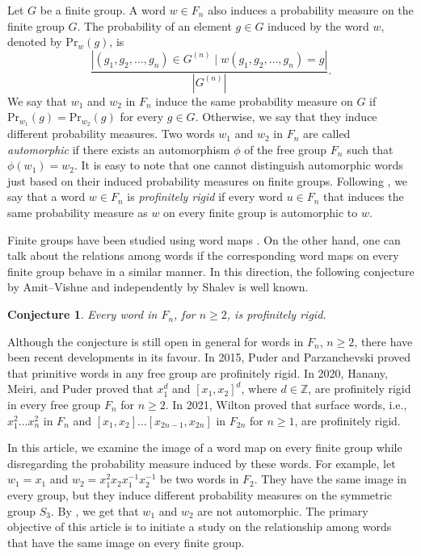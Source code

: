 \documentclass[12pt]{amsart}
\def \Z {{\mathbb{Z}}}
\newtheorem{conj}[theorem]{Conjecture}
\begin{document}
Let $G$ be a finite group. A word $w \in F_n$ also induces a probability measure on the finite group $G.$ The probability of an element $g \in G$ induced by the word $w$, denoted by $\mathrm{Pr}_w(g)$, is $$\frac{|(g_1,g_2,\ldots,g_n) \in G^{(n)} \mid w(g_1,g_2,\ldots,g_n) = g|}{|G^{(n)}|}.$$
 We say that $w_1$ and $w_2$ in $F_n$ induce the same probability measure on $G$ if  $\mathrm{Pr}_{w_1}(g) = \mathrm{Pr}_{w_2}(g)$ for every $g \in G$. Otherwise, we say that they induce different probability measures. Two words $w_1$ and $w_2$ in $F_n$ are called {\it automorphic} if there exists an automorphism $\phi$ of the free group $F_n$ such that $\phi(w_1) = w_2.$ It is easy to note that one cannot distinguish automorphic words just based on their induced probability measures on finite groups. Following \cite{hanany2020some}, we say that a word $w \in F_n$ is {\it profinitely rigid} if every word $u\in F_n$ that induces the same probability measure as $w$ on every finite group is automorphic to $w$.


 Finite groups have been studied using word maps \cite{Bray,cockeho,Segal}. On the other hand, one can talk about the relations among words if the corresponding word maps on every finite group behave in a similar manner. In this direction, the following conjecture by Amit--Vishne and independently by Shalev is well known.  

\begin{conj}\cite{amit2011characters,shalev2013some} \label{shalev}
Every word in $F_n$, for $n \geq 2$, is profinitely rigid.
\end{conj}
 Although the conjecture is still open in general for words in $F_n$, $n \geq 2$, there have been recent developments in its favour. In 2015, Puder and Parzanchevski \cite{puder2015measure} proved that primitive words in any free group are profinitely rigid. In 2020, Hanany, Meiri, and Puder \cite{hanany2020some} proved that $x_1^d$ and $[x_1, x_2]^d$, where $d \in \Z$, are profinitely rigid in every free group $F_n$ for $n \geq 2$. In 2021, Wilton \cite{wilton2021profinite} proved that surface words,  i.e., $x_1^2\ldots x_n^2$ in $F_n$ and $[x_1,x_2]\ldots [x_{2n-1},x_{2n}]$ in $F_{2n}$ for $n \geq 1$, are profinitely rigid.     

In this article, we examine the image of a word map on every finite group while disregarding the probability measure induced by these words. For example,
let $w_1 = x_1$ and $w_2 = x_1^2x_2x_1^{-1}x_2^{-1}$ be two words in $F_2$. They have the same image in every group, but they induce different probability measures on the symmetric group $S_3$. By \cite{puder2015measure}, we get that $w_1$ and $w_2$ are not automorphic. The primary objective of this article is to initiate a study on the relationship among words that have the same image on every finite group.
\end{document}
